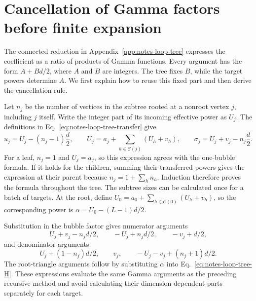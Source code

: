 \section{Cancellation of Gamma factors before finite expansion}
\label{app:notes-gamma-cancel}
The connected reduction in Appendix~\ref{app:notes-loop-tree} expresses the coefficient as a ratio of products of Gamma functions. Every argument has the form $A+Bd/2$, where $A$ and $B$ are integers. The tree fixes $B$, while the target powers determine $A$. We first explain how to reuse this fixed part and then derive the cancellation rule.

Let $n_j$ be the number of vertices in the subtree rooted at a nonroot vertex $j$, including $j$ itself. Write the integer part of its incoming effective power as $U_j$. The definitions in Eq.~\eqref{eq:notes-loop-tree-transfer} give
\begin{equation}
 u_j=U_j-(n_j-1)\frac d2,
 \qquad U_j=a_j+\sum_{h\in\mathcal C(j)}(U_h+v_h),
 \qquad \sigma_j=U_j+v_j-n_j\frac d2.
 \label{eq:notes-gamma-cancel-subtree}
\end{equation}
For a leaf, $n_j=1$ and $U_j=a_j$, so this expression agrees with the one-bubble formula. If it holds for the children, summing their transferred powers gives the expression at their parent because $n_j=1+\sum_h n_h$. Induction therefore proves the formula throughout the tree. The subtree sizes can be calculated once for a batch of targets. At the root, define $U_0=a_0+\sum_{h\in\mathcal C(0)}(U_h+v_h)$, so the corresponding power is $\alpha=U_0-(L-1)d/2$.

Substitution in the bubble factor gives numerator arguments
\begin{equation}
 U_j+v_j-n_jd/2,\qquad -U_j+n_jd/2,\qquad -v_j+d/2,
\end{equation}
and denominator arguments
\begin{equation}
 U_j+(1-n_j)d/2,\qquad v_j,\qquad -U_j-v_j+(n_j+1)d/2.
\end{equation}
The root-triangle arguments follow by substituting $\alpha$ into Eq.~\eqref{eq:notes-loop-tree-H}. These expressions evaluate the same Gamma arguments as the preceding recursive method and avoid calculating their dimension-dependent parts separately for each target.

